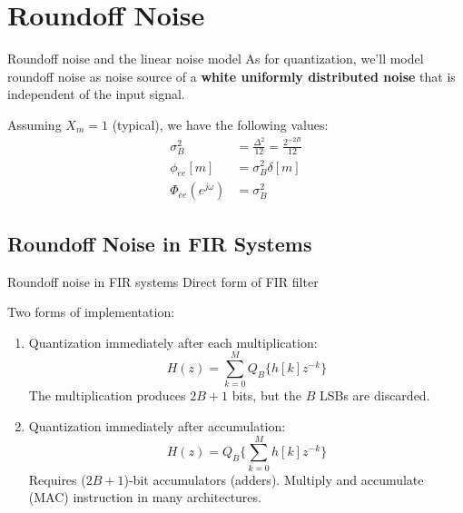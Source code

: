 \documentclass[10pt, handout]{beamer}
\begin{document}
%
\section{Roundoff Noise}
\begin{frame}{Roundoff noise and the linear noise model}
As for quantization, we'll model roundoff noise as noise source of a \textbf{white uniformly distributed noise} that is independent of the input signal. 

\begin{center}
\resizebox{0.6\textwidth}{!}{}
\end{center}

Assuming $X_m = 1$ (typical), we have the following values:
\begin{align*}
\sigma_B^2 &= \frac{\Delta^2}{12} =  \frac{2^{-2B}}{12}\tag{average power} \\
\phi_{ee}[m] &= \sigma_B^2\delta[m] \tag{autocorrelation function} \\
\Phi_{ee}(e^{j\omega}) &= \sigma_B^2 \tag{PSD}
\end{align*}
\end{frame}

\subsection{Roundoff Noise in FIR Systems}
\begin{frame}{Roundoff noise in FIR systems}
	Direct form of FIR filter
	\begin{center}
		\resizebox{0.75\textwidth}{!}{}
	\end{center}
	\vspace{-0.4cm}
	Two forms of implementation:
	\begin{enumerate}
		\item Quantization immediately after each multiplication:
		\begin{equation*}
		H(z) = \sum_{k = 0}^M Q_B\{h[k]z^{-k}\}
		\end{equation*}
		The multiplication produces $2B+1$ bits, but the $B$ LSBs are discarded.
		\item Quantization immediately after accumulation:
		\begin{equation*}
		H(z) = Q_B\bigg\lbrace\sum_{k = 0}^M h[k]z^{-k}\bigg\rbrace
		\end{equation*}
		Requires ($2B+1$)-bit accumulators (adders). Multiply and accumulate (MAC) instruction in many architectures.
	\end{enumerate}	
\end{frame}
\end{document}
